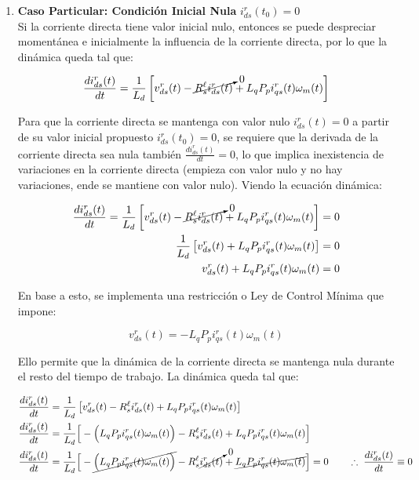\documentclass[blue,fullpaper]{ludusofficial}  %
\begin{document}
\begin{enumerate}
    \item \textbf{Caso Particular: Condición Inicial Nula} $i_{ds}^{r}(t_0) = 0$ \\
    Si la corriente directa tiene valor inicial nulo, entonces se puede despreciar momentánea e inicialmente la influencia de la corriente directa, por lo que la dinámica queda tal que:

    \begin{equation*}
        \frac{di_{ds}^{r}(t)}{dt} = \frac{1}{L_{d}} \left[ v_{ds}^{r}(t) - \cancelto{0}{R_{s}^{\ell} i_{ds}^{r}(t)} + L_{q}P_{p} i_{qs}^{r}(t) \omega_{m}(t) \right]
    \end{equation*}

    Para que la corriente directa se mantenga con valor nulo $i_{ds}^{r}(t) = 0$ a partir de su valor inicial propuesto $i_{ds}^{r}(t_0) = 0$, se requiere que la derivada de la corriente directa sea nula también $\frac{di_{ds}^{r}(t)}{dt} = 0$, lo que implica inexistencia de variaciones en la corriente directa (empieza con valor nulo y no hay variaciones, ende se mantiene con valor nulo). Viendo la ecuación dinámica:

    \begin{align*}
        \frac{di_{ds}^{r}(t)}{dt} = \frac{1}{L_{d}} \left[ v_{ds}^{r}(t) - \cancelto{0}{R_{s}^{\ell} i_{ds}^{r}(t)} + L_{q}P_{p} i_{qs}^{r}(t) \omega_{m}(t) \right] & = 0 \\
        \frac{1}{L_{d}} \left[ v_{ds}^{r}(t) + L_{q}P_{p} i_{qs}^{r}(t) \omega_{m}(t) \right] & = 0 \\
         v_{ds}^{r}(t) + L_{q}P_{p} i_{qs}^{r}(t) \omega_{m}(t) & = 0
    \end{align*}

    En base a esto, se implementa una restricción o Ley de Control Mínima que impone:
    
    \begin{equation}
\label{eq:ley-minima}
        v_{ds}^{r}(t)  = -L_{q}P_{p} i_{qs}^{r}(t) \omega_{m}(t)
    \end{equation}
    
    Ello permite que la dinámica de la corriente directa se mantenga nula durante el resto del tiempo de trabajo. La dinámica queda tal que:

    \begin{align*}
        \frac{di_{ds}^{r}(t)}{dt} & = \frac{1}{L_{d}} \left[v_{ds}^{r}(t) - R_{s}^{\ell} i_{ds}^{r}(t) + L_{q}P_{p} i_{qs}^{r}(t) \omega_{m}(t) \right]
        \\
        \frac{di_{ds}^{r}(t)}{dt} & = \frac{1}{L_{d}} \Big[ - \Big(  L_{q}P_{p} i_{qs}^{r}(t) \omega_{m}(t) \Big) - R_{s}^{\ell} i_{ds}^{r}(t) + L_{q}P_{p} i_{qs}^{r}(t) \omega_{m}(t) \Big]
        \\
        \frac{di_{ds}^{r}(t)}{dt} & = \frac{1}{L_{d}} \Big[ - \cancel{ \Big(  L_{q}P_{p} i_{qs}^{r}(t) \omega_{m}(t) \Big) } - R_{s}^{\ell} \cancelto{ 0 }{  i_{ds}^{r}(t) } + \cancel{ L_{q}P_{p} i_{qs}^{r}(t) \omega_{m}(t)  }\Big] = 0 \qquad \therefore \; \frac{di_{ds}^{r}(t)}{dt} \equiv 0
    \end{align*}
    

\end{enumerate}
\end{document}
